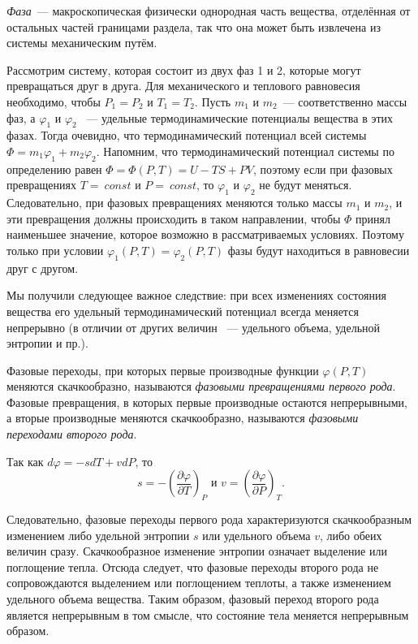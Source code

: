 \documentclass[a4paper, 12pt]{article}
\begin{document}
\emph{Фаза}~--- макроскопическая физически однородная часть вещества, отделённая от остальных частей границами раздела, так что она может быть извлечена из системы механическим путём.

Рассмотрим систему, которая состоит из двух фаз 1 и 2, которые могут превращаться друг в друга. Для механического и теплового равновесия необходимо, чтобы $P_1 = P_2$ и $T_1 = T_2$. Пусть $m_1$ и $m_2$~--- соответственно массы фаз, а $\varphi_1$ и $\varphi_2$  ~--- удельные термодинамические потенциалы вещества в этих фазах. Тогда очевидно, что термодинамический потенциал всей системы $\Phi = m_1 \varphi_1 + m_2 \varphi_2$. Напомним, что термодинамический потенциал системы по определению равен $\Phi = \Phi(P, T) = U - TS + PV$, поэтому если при фазовых превращениях $T = ~const$ и $P =~const$, то $\varphi_1$ и $\varphi_2$ не будут меняться. Следовательно, при фазовых превращениях меняются только массы $m_1$ и $m_2$, и эти превращения должны происходить в таком направлении, чтобы $\Phi$ принял наименьшее значение, которое возможно в рассматриваемых условиях. Поэтому только при условии $\varphi_1(P, T) = \varphi_2(P, T)$ фазы будут находиться в равновесии друг с другом.

Мы получили следующее важное следствие: при всех изменениях состояния вещества его удельный термодинамический потенциал всегда меняется непрерывно (в отличии от других величин ~--- удельного объема, удельной энтропии и пр.).

Фазовые переходы, при которых первые производные функции $\varphi(P, T)$ меняются скачкообразно, называются \emph{фазовыми превращениями первого рода}. Фазовые превращения, в которых первые производные остаются непрерывными, а вторые производные меняются скачкообразно, называются \emph{фазовыми переходами второго рода}.

Так как $ d \varphi = - s dT + v d P$, то
$$
	s = - \left( \frac{\partial \varphi }{\partial T} \right)_{P} \text{ и } 
	v = \left( \frac{\partial \varphi }{\partial P} \right)_{T} .
$$

Следовательно, фазовые переходы первого рода характеризуются скачкообразным изменением либо удельной энтропии $s$ или удельного объема $v$, либо обеих величин сразу. Скачкообразное изменение энтропии означает выделение или поглощение тепла. Отсюда следует, что фазовые переходы второго рода не сопровождаются выделением или поглощением теплоты, а также изменением удельного объема вещества. Таким образом, фазовый переход второго рода является непрерывным в том смысле, что состояние тела меняется непрерывным образом.
\end{document}
